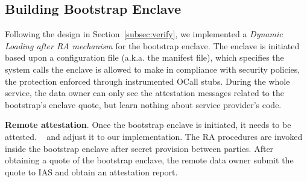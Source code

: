 \subsection{Building Bootstrap Enclave}\label{subsec:bootstrap-impl}
%
Following the design in Section~\ref{subsec:verify}, we implemented a \textit{Dynamic Loading after RA mechanism} for the bootstrap enclave. The enclave is initiated based upon a configuration file (a.k.a. the manifest file), which specifies the system calls the enclave is allowed to make in compliance with security policies, the protection enforced through instrumented OCall stubs. During the whole service, the data owner can only see the attestation messages related to the bootstrap's enclave quote, but learn nothing about service provider’s code.




\vspace{3pt}\noindent\textbf{Remote attestation}.\label{subsec:ra-impl}
Once the bootstrap enclave is initiated, it needs to be attested. 
~\cite{knauth2018integrating} and adjust it to our implementation.
The RA procedures are invoked inside the bootstrap enclave after secret provision between parties. After obtaining a quote of the bootstrap enclave, the remote data owner submit the quote to IAS and obtain an attestation report. 



